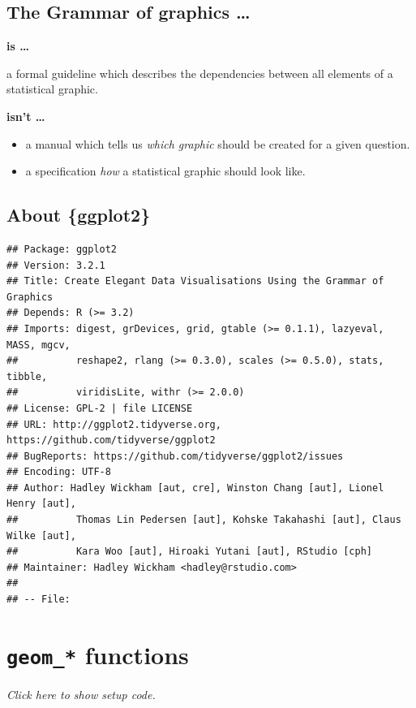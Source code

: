 \documentclass[]{book}
\providecommand{\tightlist}{%
  \setlength{\itemsep}{0pt}\setlength{\parskip}{0pt}}
\begin{document}
\hypertarget{the-grammar-of-graphics}{%
\subsection{The Grammar of graphics \ldots{}}\label{the-grammar-of-graphics}}

\textbf{is \ldots{}}

a formal guideline which describes the dependencies between all elements of a
statistical graphic.

\textbf{isn't \ldots{}}

\begin{itemize}
\tightlist
\item
  a manual which tells us \emph{which graphic} should be created for a given question.
\item
  a specification \emph{how} a statistical graphic should look like.
\end{itemize}

\hypertarget{about-ggplot2}{%
\subsection{About \{ggplot2\}}\label{about-ggplot2}}

\begin{verbatim}
## Package: ggplot2
## Version: 3.2.1
## Title: Create Elegant Data Visualisations Using the Grammar of Graphics
## Depends: R (>= 3.2)
## Imports: digest, grDevices, grid, gtable (>= 0.1.1), lazyeval, MASS, mgcv,
##          reshape2, rlang (>= 0.3.0), scales (>= 0.5.0), stats, tibble,
##          viridisLite, withr (>= 2.0.0)
## License: GPL-2 | file LICENSE
## URL: http://ggplot2.tidyverse.org, https://github.com/tidyverse/ggplot2
## BugReports: https://github.com/tidyverse/ggplot2/issues
## Encoding: UTF-8
## Author: Hadley Wickham [aut, cre], Winston Chang [aut], Lionel Henry [aut],
##          Thomas Lin Pedersen [aut], Kohske Takahashi [aut], Claus Wilke [aut],
##          Kara Woo [aut], Hiroaki Yutani [aut], RStudio [cph]
## Maintainer: Hadley Wickham <hadley@rstudio.com>
## 
## -- File:
\end{verbatim}

\hypertarget{geom_-functions}{%
\section{\texorpdfstring{\texttt{geom\_*} functions}{geom\_* functions}}\label{geom_-functions}}

\emph{Click here to show setup code.}
\end{document}
